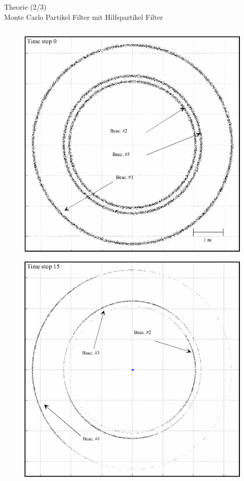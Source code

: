 \documentclass{beamer}
\begin{document}
\begin{frame}{Theorie (2/3)\\Monte Carlo Partikel Filter mit Hilfspartikel Filter}
	\begin{columns}
			\begin{overlayarea}{\textwidth}{.7\textheight}
				\only<1>
				{
					\begin{figure}
						\centering
						\includegraphics[width=\linewidth]{blanco2008pure_fig3e}
						\caption{\cite{blanco2008pure}}
					\end{figure}
				}
				{
					\begin{figure}
						\centering
						\includegraphics[width=\linewidth]{blanco2008pure_fig3f}

\end{figure}}
\end{overlayarea}
\end{columns}
\end{frame}
\end{document}
